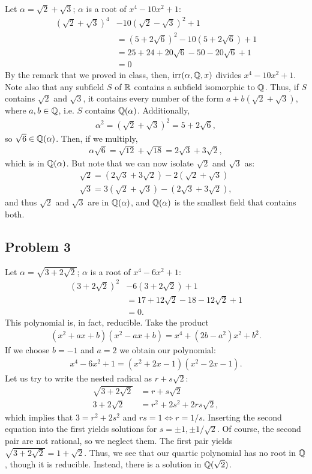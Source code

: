 \documentclass{../../mathnotes}
\begin{document}
Let $\alpha=\sqrt{2}+\sqrt{3}$; $\alpha$ is a root of $x^4-10x^2+1$:
\begin{align*}
    (\sqrt{2}+\sqrt{3})^4&-10(\sqrt{2}-\sqrt{3})^2+1\\
    &=(5+2\sqrt{6})^2-10(5+2\sqrt{6})+1\\
    &=25+24+20\sqrt{6}-50-20\sqrt{6}+1\\
    &=0
\end{align*}
By the remark that we proved in class, then, $\operatorname{irr}(\alpha,\mathbb{Q},x)$ divides $x^4-10x^2+1$. Note also that any subfield
$S$ of $\mathbb{R}$ contains a subfield isomorphic to $\mathbb{Q}$. Thus, if $S$ contains $\sqrt{2}$ and $\sqrt{3}$, it contains 
every number of the form $a+b(\sqrt{2}+\sqrt{3})$, where $a,b\in\mathbb{Q}$, i.e. $S$ contains $\mathbb{Q}(\alpha)$. Additionally,
\begin{align*}
    \alpha^2=(\sqrt{2}+\sqrt{3})^2=5+2\sqrt{6},
\end{align*}
so $\sqrt{6}\in\mathbb{Q}(\alpha)$. Then, if we multiply, 
\begin{align*}
    \alpha\sqrt{6}=\sqrt{12}+\sqrt{18}=2\sqrt{3}+3\sqrt{2},
\end{align*}
which is in $\mathbb{Q}(\alpha)$. But note that we can now isolate $\sqrt{2}$ and $\sqrt{3}$ as:
\begin{align*}
    \sqrt{2}=(2\sqrt{3}+3\sqrt{2})-2(\sqrt{2}+\sqrt{3})\\
    \sqrt{3}=3(\sqrt{2}+\sqrt{3})-(2\sqrt{3}+3\sqrt{2}),
\end{align*}
and thus $\sqrt{2}$ and $\sqrt{3}$ are in $\mathbb{Q}(\alpha)$, and $\mathbb{Q}(\alpha)$ is the smallest field that contains both.

\subsection*{Problem 3}

Let $\alpha=\sqrt{3+2\sqrt{2}}$; $\alpha$ is a root of $x^4-6x^2+1$:
\begin{align*}
    (3+2\sqrt{2})^2&-6(3+2\sqrt{2})+1\\
    &=17+12\sqrt{2}-18-12\sqrt{2}+1\\
    &=0.
\end{align*}
This polynomial is, in fact, reducible. Take the product
\begin{align*}
    (x^2+ax+b)(x^2-ax+b)=x^4+(2b-a^2)x^2+b^2.
\end{align*}
If we choose $b=-1$ and $a=2$ we obtain our polynomial:
\begin{align*}
    x^4-6x^2+1=(x^2+2x-1)(x^2-2x-1).
\end{align*}
Let us try to write the nested radical as $r+s\sqrt{2}$:
\begin{align*}
    \sqrt{3+2\sqrt{2}}&=r+s\sqrt{2}\\
    3+2\sqrt{2}&=r^2+2s^2+2rs\sqrt{2},
\end{align*}
which implies that $3=r^2+2s^2$ and $rs=1\iff r=1/s$. Inserting the second equation into the first yields
solutions for $s=\pm1,\pm1/\sqrt{2}$. Of course, the second pair are not rational, so we neglect them.
The first pair yields $\sqrt{3+2\sqrt{2}}=1+\sqrt{2}$. Thus, we see that our quartic polynomial has no
root in $\mathbb{Q}$, though it is reducible. Instead, there is a solution in $\mathbb{Q}(\sqrt{2})$.
\end{document}
